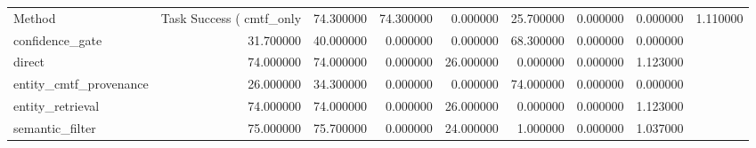\begin{tabular}{lrrrrrrr}
\toprule
Method & Task Success (%
\midrule
cmtf_only & 74.300000 & 74.300000 & 0.000000 & 25.700000 & 0.000000 & 0.000000 & 1.110000 \\
confidence_gate & 31.700000 & 40.000000 & 0.000000 & 0.000000 & 68.300000 & 0.000000 & 0.000000 \\
direct & 74.000000 & 74.000000 & 0.000000 & 26.000000 & 0.000000 & 0.000000 & 1.123000 \\
entity_cmtf_provenance & 26.000000 & 34.300000 & 0.000000 & 0.000000 & 74.000000 & 0.000000 & 0.000000 \\
entity_retrieval & 74.000000 & 74.000000 & 0.000000 & 26.000000 & 0.000000 & 0.000000 & 1.123000 \\
semantic_filter & 75.000000 & 75.700000 & 0.000000 & 24.000000 & 1.000000 & 0.000000 & 1.037000 \\
\bottomrule
\end{tabular}
